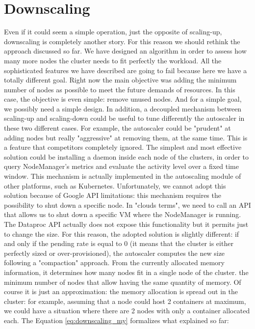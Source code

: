 \documentclass[12pt,twoside,cucitura]{toptesi}
\begin{document}
\section{Downscaling}
Even if it could seem a simple operation, just the opposite of scaling-up, downscaling is completely another story. For this reason we should rethink the approach discussed so far. We have designed an algorithm in order to assess how many more nodes the cluster needs to fit perfectly the workload. All the sophisticated features we have described are going to fail because here we have a totally different goal. Right now the main objective was adding the minimum number of nodes as possible to meet the future demands of resources. In this case, the objective is even simple: remove unused nodes. And for a simple goal, we possibly need a simple design. In addition, a decoupled mechanism between scaling-up and scaling-down could be useful to tune differently the autoscaler in these two different cases. For example, the autoscaler could be "prudent" at adding nodes but really "aggressive" at removing them, at the same time. This is a feature that competitors completely ignored.
The simplest and most effective solution could be installing a daemon inside each node of the clusters, in order to query NodeManager's metrics and evaluate the activity level over a fixed time window. This mechanism is actually implemented in the autoscaling module of other platforms, such as Kubernetes. Unfortunately, we cannot adopt this solution because of Google API limitations: this mechanism requires the possibility to shut down a specific node. In "clouds terms", we need to call an API that allows us to shut down a specific VM where the NodeManager is running. The Dataproc API actually does not expose this functionality but it permits just to change the size. For this reason, the adopted solution is slightly different: if and only if the pending rate is equal to 0 (it means that the cluster is either perfectly sized or over-provisioned), the autoscaler computes the new size following a "compaction" approach. From the currently allocated memory information, it determines how many nodes fit in a single node of the cluster. the minimum number of nodes that allow having the same quantity of memory. Of course it is just an approximation: the memory allocation is spread out in the cluster: for example, assuming that a node could host 2 containers at maximum, we could have a situation where there are 2 nodes with only a container allocated each. The Equation \ref{eq:downscaling_my} formalizes what explained so far:
\end{document}
